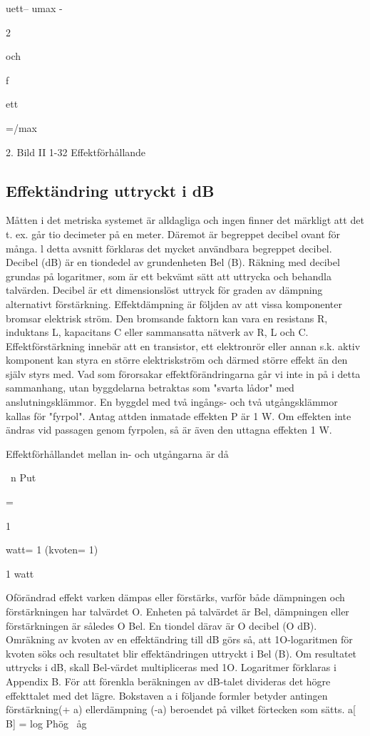 \documentclass[a4paper,twoside,twocolumn,openright]{book}
\begin{document}
uett-- umax
-{2

och

f

ett

=/max

{2.
Bild II 1-32 Effektförhållande

\subsection{Effektändring uttryckt i dB}
Måtten i det metriska systemet är alldagliga
och ingen finner det märkligt att det t. ex. går
tio decimeter på en meter. Däremot är begreppet decibel ovant för många.
l detta avsnitt förklaras det mycket användbara begreppet decibel. Decibel (dB) är
en tiondedel av grundenheten Bel (B).
Räkning med decibel grundas på logaritmer, som är ett bekvämt sätt att uttrycka och
behandla talvärden.
Decibel är ett dimensionslöst uttryck
för graden av dämpning alternativt förstärkning.
Effektdämpning är följden av att vissa
komponenter bromsar elektrisk ström. Den
bromsande faktorn kan vara en resistans R,
induktans L, kapacitans C eller sammansatta nätverk av R, L och C.
Effektförstärkning innebär att en transistor, ett elektronrör eller annan s.k. aktiv
komponent kan styra en större elektriskström
och därmed större effekt än den själv styrs
med. Vad som förorsakar effektförändringarna går vi inte in på i detta sammanhang,
utan byggdelarna betraktas som "svarta lådor" med anslutningsklämmor.
En byggdel med två ingångs- och två
utgångsklämmor kallas för "fyrpol".
Antag attden inmatade effekten P är 1 W.
Om effekten inte ändras vid passagen genom fyrpolen, så är även den uttagna effekten 1 W.

Effektförhållandet mellan in- och utgångarna är då

~n
Put

=

1

watt= 1 (kvoten= 1)

1 watt

Oförändrad effekt varken dämpas eller
förstärks, varför både dämpningen och förstärkningen har talvärdet O. Enheten på talvärdet är Bel, dämpningen eller förstärkningen är således O Bel. En tiondel därav är
O decibel (O dB).
Omräkning av kvoten av en effektändring
till dB görs så, att 1O-logaritmen för kvoten
söks och resultatet blir effektändringen uttryckt i Bel (B). Om resultatet uttrycks i dB,
skall Bel-värdet multipliceras med 1O.
Logaritmer förklaras i Appendix B.
För att förenkla beräkningen av dB-talet
divideras det högre effekttalet med det lägre.
Bokstaven a i följande formler betyder antingen förstärkning(+ a) ellerdämpning (-a)
beroendet på vilket förtecken som sätts.
a[ B] = log Phög
~åg

}}
\end{document}
